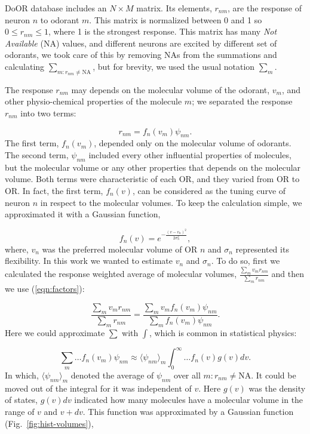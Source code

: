 \documentclass[11pt]{paper} %
\begin{document}
DoOR database includes an $N\times M$ matrix. 
Its elements, $r_{nm}$, are the response of neuron $n$ to odorant $m$. 
This matrix is normalized between 0 and 1 so $0 \le r_{nm} \le 1$, where 1 is the strongest response.
This matrix has many {\it Not Available} (NA) values, 
and different neurons are excited by different set of odorants, 
we took care of this by removing NAs from the summations and calculating $\sum_{m: r_{nm} \neq \text{NA}}$, 
but for brevity, we used the usual notation $\sum_m$.

The response $r_{nm}$ may depends on the molecular volume of the odorant, $v_m$, 
and other physio-chemical properties of the molecule $m$; 
we separated the response $r_{nm}$ into two terms:

\begin{equation}
	r_{nm} = f_n(v_m) \psi_{nm}.
	\label{eqn:factors}
\end{equation}
The first term, $f_n(v_m)$, depended only on the molecular volume of odorants.
The second term, $\psi_{nm}$ included every other influential properties of molecules, but the molecular volume or any other properties that depends on the molecular volume.
Both terms were characteristic of each OR, and they varied from OR to OR.
In fact, the first term, $f_n(v)$, can be considered as the tuning curve of neuron $n$ in respect to the molecular volumes. 
To keep the calculation simple, we approximated it with a Gaussian function,  

\begin{equation}
	\displaystyle f_n(v) = e^{-\frac{(v-v_n)^2}{2\sigma^2_n}}, 
	\label{eqn:volume-dependence}
\end{equation}
where, $v_n$ was the preferred molecular volume of OR $n$ and $\sigma_n$ represented its flexibility. 
In this work we wanted to estimate $v_n$ and $\sigma_n$. 
To do so, first we calculated the response weighted average of molecular volumes, 
$\frac{\sum_{m} v_m r_{nm}}{\sum_{m} r_{nm}}$ and then we use (\ref{eqn:factors}):

\begin{equation}
	\frac{\displaystyle \sum_{m} v_m r_{nm}}{\displaystyle \sum_{m} r_{nm}} = \frac{\displaystyle \sum_{m} v_m f_n(v_m) \psi_{nm}}{\displaystyle \sum_{m} f_n(v_m) \psi_{nm}}.
	\label{eqn:sta}
\end{equation}
Here we could approximate $\sum$ with $\int$, which is common in statistical physics:

\begin{equation}
	\sum_{m} \dots f_n(v_m) \psi_{nm} \approx  \langle \psi_{nm} \rangle_m \int_0^\infty \dots f_n(v) g(v)  dv. 
	\label{eqn:sigma_to_int}
\end{equation}
In which, 
$\langle \psi_{nm} \rangle_m$ denoted the average of $\psi_{nm}$ over all $m: r_{nm} \neq \text{NA}$. 
It could be moved out of the integral for it was independent of $v$.
Here $g(v)$ was the density of states, $g(v) dv$ indicated how many molecules have a molecular volume in the range of $v$ and $v+dv$.
This function was approximated by a Gaussian function (Fig.~\ref{fig:hist-volumes}), 
\end{document}
